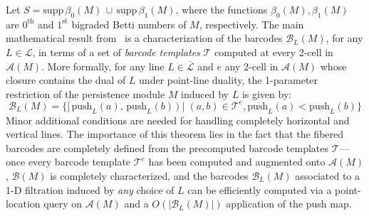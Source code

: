 \documentclass{siamart190516}
\begin{document}
Let $S = \mathrm{supp}\,\beta_0(M) \, \cup \, \mathrm{supp}\,\beta_1(M)$, where the functions $\beta_0(M), \beta_1(M)$ are $0^{\text{th}}$ and $1^{\text{st}}$ bigraded Betti numbers of $M$, respectively. 
The main mathematical result from~\cite{lesnick2015interactive} is a characterization of the barcodes $\mathcal{B}_L(M)$, for any $L \in \mathcal{L}$, in terms of a set of \emph{barcode templates} $\mathcal{T}$ computed at every 2-cell in $\mathcal{A}(M)$.
 More formally, for any line $L \in \overline{\mathcal{L}}$ and $e$ any 2-cell in $\mathcal{A}(M)$ whose closure contains the dual of $L$ under point-line duality, the 1-parameter restriction of the persistence module $M$ induced by $L$ is given by: 
 \begin{equation}
 \mathcal{B}_L(M) = \{ [\,\mathrm{push}_L(a), \, \mathrm{push}_L(b)\,) \mid (a,b) \in \mathcal{T}^e, \mathrm{push}_L(a) < \mathrm{push}_L(b)  \} 
\end{equation}
Minor additional conditions are needed for handling completely horizontal and vertical lines. 
The importance of this theorem lies in the fact that the fibered barcodes are completely defined from the precomputed barcode templates $\mathcal{T}$---once every barcode template $\mathcal{T}^e$ has been computed and augmented onto $\mathcal{A}(M)$, $\mathcal{B}(M)$ is completely characterized, and the barcodes $\mathcal{B}_L(M)$ associated to a 1-D filtration induced by \emph{any} choice of $L$ can be efficiently computed via a point-location query on $\mathcal{A}(M)$ and a $O(\lvert \mathcal{B}_L(M) \rvert)$ application of the push map.

 

\end{document}
